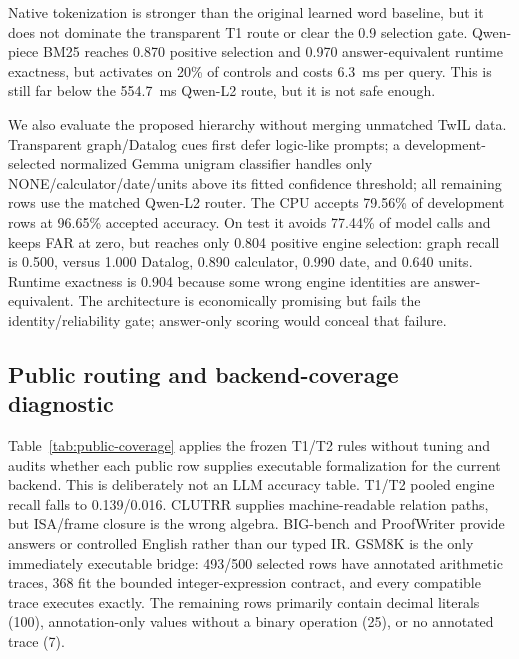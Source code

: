 \documentclass[10pt]{article}
\begin{document}
Native tokenization is stronger than the original learned word baseline, but it
does not dominate the transparent T1 route or clear the 0.9 selection gate.
Qwen-piece BM25 reaches 0.870 positive selection and 0.970 answer-equivalent
runtime exactness, but activates on 20\% of controls and costs 6.3~ms per query.
This is still far below the 554.7~ms Qwen-L2 route, but it is not safe enough.

We also evaluate the proposed hierarchy without merging unmatched TwIL data.
Transparent graph/Datalog cues first defer logic-like prompts; a
development-selected normalized Gemma unigram classifier handles only
NONE/calculator/date/units above its fitted confidence threshold; all remaining
rows use the matched Qwen-L2 router. The CPU accepts 79.56\% of development rows
at 96.65\% accepted accuracy. On test it avoids 77.44\% of model calls and keeps
FAR at zero, but reaches only 0.804 positive engine selection: graph recall is
0.500, versus 1.000 Datalog, 0.890 calculator, 0.990 date, and 0.640 units.
Runtime exactness is 0.904 because some wrong engine identities are
answer-equivalent. The architecture is economically promising but fails the
identity/reliability gate; answer-only scoring would conceal that failure.

\subsection{Public routing and backend-coverage diagnostic}

Table~\ref{tab:public-coverage} applies the frozen T1/T2 rules without tuning
and audits whether each public row supplies executable formalization for the
current backend.  This is deliberately not an LLM accuracy table.  T1/T2 pooled
engine recall falls to 0.139/0.016.  CLUTRR supplies machine-readable relation
paths, but ISA/frame closure is the wrong algebra.  BIG-bench and ProofWriter
provide answers or controlled English rather than our typed IR.  GSM8K is the
only immediately executable bridge: 493/500 selected rows have annotated
arithmetic traces, 368 fit the bounded integer-expression contract, and every
compatible trace executes exactly.  The remaining rows primarily contain
decimal literals (100), annotation-only values without a binary operation (25),
or no annotated trace (7).
\end{document}
